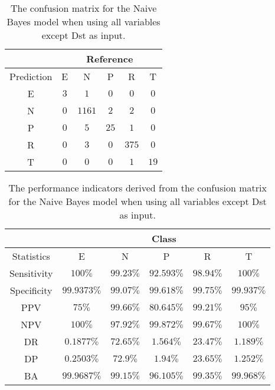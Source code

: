 \documentclass[preprint,12pt]{elsarticle}
\begin{document}
\begin{table}[!ht]
	\centering
	\begin{tabular}{|c|c|c|c|c|c|}
		\hline
		 & \multicolumn{5}{|c|}{Reference} \\ \hline
		 Prediction & E & N & P & R & T \\ \hline
		 E & $3$ & $1$ & $0$ & $0$ & $0$ \\ \hline
		 N & $0$ & $1161$ & $2$ & $2$ & $0$ \\ \hline
		 P & $0$ & $5$ & $25$ & $1$ & $0$ \\ \hline
		 R & $0$ & $3$ & $0$ & $375$ & $0$ \\ \hline
		 T & $0$ & $0$ & $0$ & $1$ & $19$ \\ \hline
	\end{tabular}
	\caption{The confusion matrix for the Naive Bayes model when using all variables except Dst as input.}
	\label{tab:cm:noDst:nb}
\end{table}

\begin{table}[!ht]
	\centering
	\begin{tabular}{|c|c|c|c|c|c|}
		\hline
		 & \multicolumn{5}{c|}{Class} \\ \hline
		Statistics & E & N & P & R & T \\ \hline
		Sensitivity & $100\%$ & $99.23\%$ & $92.593\%$ & $98.94\%$ & $100\%$ \\ \hline
		Specificity & $99.9373\%$ & $99.07\%$ & $99.618\%$ & $99.75\%$ & $99.937\%$ \\ \hline
		PPV & $75\%$ & $99.66\%$ & $80.645\%$ & $99.21\%$ & $95\%$ \\ \hline
		NPV & $100\%$ & $97.92\%$ & $99.872\%$ & $99.67\%$ & $100\%$ \\ \hline
		DR & $0.1877\%$ & $72.65\%$ & $1.564\%$ & $23.47\%$ & $1.189\%$ \\ \hline
		DP & $0.2503\%$ & $72.9\%$ & $1.94\%$ & $23.65\%$ & $1.252\%$ \\ \hline
		BA & $99.9687\%$ & $99.15\%$ & $96.105\%$ & $99.35\%$ & $99.968\%$ \\ \hline
	\end{tabular}
	\caption{The performance indicators derived from the confusion matrix for the Naive Bayes model when using all variables except Dst as input.}
	\label{tab:cs:reverse:noDst:nb}
\end{table}
\end{document}
